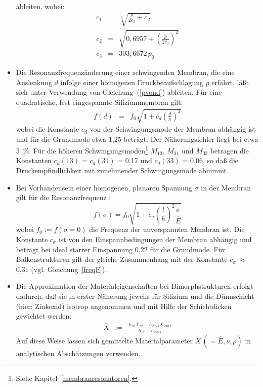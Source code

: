 \begin{itemize}
\begin{eqnarray}
\end{eqnarray}
ableiten, wobei:
\begin{eqnarray}
 c_{1}       & = & \sqrt [3] {\frac{p}{2c_{3}} + c_{2} }
\nonumber \\
 c_{2}       & = & \sqrt{0,6957 + {\left( \frac{p}{2c_{3}} \right)}^2}
\nonumber \\
 c_{3}       & = & 303,6672 \, p_{0}
\nonumber
\end{eqnarray}
%
\item Die Resonanzfrequenzänderung einer schwingenden Membran, die eine
Auslenkung $d$ infolge einer homogenen Druckbeaufschlagung $p$ erfährt,
läßt sich unter Verwendung von Gleichung~(\ref{pvond}) ableiten. Für eine
quadratische, fest eingespannte Siliziummembran gilt:
\begin{eqnarray}
\label{fvondschroth}
  f(d) & = & f_{0} \sqrt{1 + c_{d} {\left( \frac{d}{h} \right)}^{2}}
\end{eqnarray}
wobei die Konstante $c_{d}$ von der Schwingungsmode der Membran abhängig
ist und für die Grundmode etwa 1,25 beträgt. Der Näherungsfehler liegt bei
etwa 5~\%. Für die höheren Schwingungsmoden\footnote{Siehe
Kapitel~\ref{membranresonatoren}.} $M_{13}$, $M_{31}$ und $M_{33}$
betragen die Konstanten $c_{d}(13)$ = $c_{d}(31)$ = 0,17 und
$c_{d}(33)$ = 0,06, so daß die Druckempfindlichkeit mit zunehmender
Schwingungsmode abnimmt \cite{Fab92a}.
%
\item Bei Vorhandensein einer homogenen, planaren Spannung $\sigma$ in der
Membran gilt für die Resonanzfrequenz \cite{Bou90}:
\begin{equation}
\label{fsigma}
  f(\sigma) = f_{0} \sqrt{1 + c_{\sigma}
                {\left( \frac{l}{h} \right)}^{2} \frac{\sigma}{\hat E}}
\end{equation}
wobei $f_{0} := f(\sigma = 0)$ die Frequenz der unverspannten Membran ist.
Die Konstante $c_{\sigma}$ ist von den Einspannbedingungen der Membran
abhängig und beträgt bei ideal starrer Einspannung 0,22 für die Grundmode.
Für Balkenstrukturen gilt der gleiche Zusammenhang mit der Konstante
$c_{\sigma}~\approx~$0,31 %
(vgl. Gleichung~\ref{freqF}).
%
\item Die Approximation der Materialeigenschaften bei Bimorphstrukturen
erfolgt dadurch, daß sie in erster Näherung jeweils für Silizium
und die Dünnschicht (hier: Zinkoxid) isotrop angenommen
und mit Hilfe der Schichtdicken gewichtet werden:
\begin{eqnarray}
\label{matwich}
 \bar X & := & \frac{h_{Si}X_{Si} + h_{ZnO}X_{ZnO}}
                    {h_{Si} + h_{ZnO}}
\end{eqnarray}
Auf diese Weise lassen sich gemittelte Materialparameter
$X \, (= \hat E, \nu, \rho)$ in analytischen Abschätzungen verwenden.
\end{itemize}


